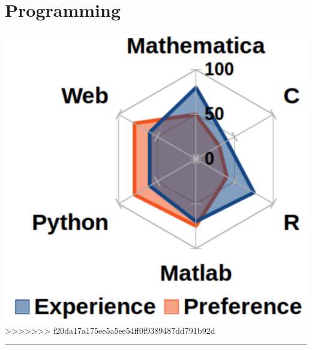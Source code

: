 \documentclass{article}
\begin{document}
\begin{minipage}[t]{0.27\textwidth}
    \section*{\fontsize{18pt}{24pt}\selectfont \color{pblue} Programming}
	\vspace{-2mm}
	\includegraphics[trim=0.5cm 0.2cm 0.3cm 0.2cm,clip,scale=0.32]{../img/programming.pdf}
>>>>>>> f20da17a175ee5a5ee54ff0f9389487dd791b92d
	\vspace{2mm}
	\hrule
	\vspace{-2mm}

\end{minipage}
\end{document}
